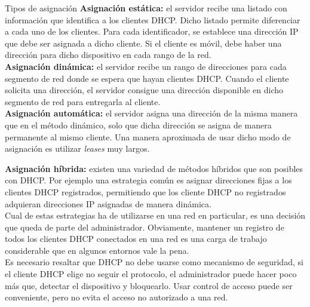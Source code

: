 \begin{frame}{Tipos de asignación} %
    \textbf{Asignación estática:} el servidor recibe una listado con
    información que identifica a los clientes DHCP. Dicho listado permite
    diferenciar a cada uno de los clientes. Para cada identificador, se
    establece una dirección IP que debe ser asignada a dicho cliente.
    Si el cliente es móvil, debe haber una dirección para dicho
    dispositivo en cada rango de la red. \\[0.2cm]

    \textbf{Asignación dinámica:} el servidor recibe un rango de direcciones
    para cada segmento de red donde se espera que hayan clientes DHCP. Cuando
    el cliente solicita una dirección, el servidor consigue una dirección
    disponible en dicho segmento de red para entregarla al cliente.\\[0.2cm]

    \textbf{Asignación automática:} el servidor asigna una dirección de la
    misma manera que en el método dinámico, solo que dicha dirección se asigna
    de manera permanente al mismo cliente. Una manera aproximada de usar dicho
    modo de asignación es utilizar \textit{leases} muy largos.\\[0.2cm]

    \framebreak

    \textbf{Asignación híbrida:} existen una variedad de métodos híbridos que
    son posibles con DHCP. Por ejemplo una estrategia común es asignar
    direcciones fijas a los clientes DHCP registrados, permitiendo que los
    cliente DHCP no registrados adquieran direcciones IP asignadas de manera
    dinámica.\\[0.2cm]

    Cual de estas estrategias ha de utilizarse en una red en particular, es una
    decisión que queda de parte del administrador. Obviamente, mantener un
    registro de todos los clientes DHCP conectados en una red es una carga de
    trabajo considerable que en algunos entornos vale la pena.\\[0.2cm]

    Es necesario resaltar que DHCP no debe usarse como mecanismo de seguridad,
    si el cliente DHCP elige no seguir el protocolo, el administrador puede
    hacer poco más que, detectar el dispositivo y bloquearlo. Usar control de acceso
    puede ser conveniente, pero no evita el acceso no autorizado a una
    red.\\[0.2cm]
    
\end{frame}

